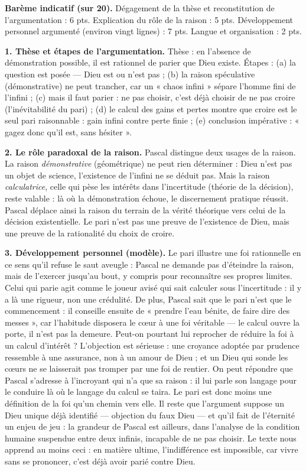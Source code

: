 \documentclass[11pt]{article}
\begin{document}
\begin{corrige}
\textbf{Barème indicatif (sur 20).} Dégagement de la thèse et reconstitution de l'argumentation : 6 pts. Explication du rôle de la raison : 5 pts. Développement personnel argumenté (environ vingt lignes) : 7 pts. Langue et organisation : 2 pts.

\textbf{1. Thèse et étapes de l'argumentation.} Thèse : en l'absence de démonstration possible, il est rationnel de parier que Dieu existe. Étapes : (a) la question est posée — Dieu est ou n'est pas ; (b) la raison spéculative (démonstrative) ne peut trancher, car un « chaos infini » sépare l'homme fini de l'infini ; (c) mais il faut parier : ne pas choisir, c'est déjà choisir de ne pas croire (l'inévitabilité du pari) ; (d) le calcul des gains et pertes montre que croire est le seul pari raisonnable : gain infini contre perte finie ; (e) conclusion impérative : « gagez donc qu'il est, sans hésiter ».

\textbf{2. Le rôle paradoxal de la raison.} Pascal distingue deux usages de la raison. La raison \emph{démonstrative} (géométrique) ne peut rien déterminer : Dieu n'est pas un objet de science, l'existence de l'infini ne se déduit pas. Mais la raison \emph{calculatrice}, celle qui pèse les intérêts dans l'incertitude (théorie de la décision), reste valable : là où la démonstration échoue, le discernement pratique réussit. Pascal déplace ainsi la raison du terrain de la vérité théorique vers celui de la décision existentielle. Le pari n'est pas une preuve de l'existence de Dieu, mais une preuve de la rationalité du choix de croire.

\textbf{3. Développement personnel (modèle).} Le pari illustre une foi rationnelle en ce sens qu'il refuse le saut aveugle : Pascal ne demande pas d'éteindre la raison, mais de l'exercer jusqu'au bout, y compris pour reconnaître ses propres limites. Celui qui parie agit comme le joueur avisé qui sait calculer sous l'incertitude : il y a là une rigueur, non une crédulité. De plus, Pascal sait que le pari n'est que le commencement : il conseille ensuite de « prendre l'eau bénite, de faire dire des messes », car l'habitude disposera le cœur à une foi véritable — le calcul ouvre la porte, il n'est pas la demeure. Peut-on pourtant lui reprocher de réduire la foi à un calcul d'intérêt ? L'objection est sérieuse : une croyance adoptée par prudence ressemble à une assurance, non à un amour de Dieu ; et un Dieu qui sonde les cœurs ne se laisserait pas tromper par une foi de rentier. On peut répondre que Pascal s'adresse à l'incroyant qui n'a que sa raison : il lui parle son langage pour le conduire là où le langage du calcul se taira. Le pari est donc moins une définition de la foi qu'un chemin vers elle. Il reste que l'argument suppose un Dieu unique déjà identifié — objection du faux Dieu — et qu'il fait de l'éternité un enjeu de jeu : la grandeur de Pascal est ailleurs, dans l'analyse de la condition humaine suspendue entre deux infinis, incapable de ne pas choisir. Le texte nous apprend au moins ceci : en matière ultime, l'indifférence est impossible, car vivre sans se prononcer, c'est déjà avoir parié contre Dieu.


\end{corrige}
\end{document}
